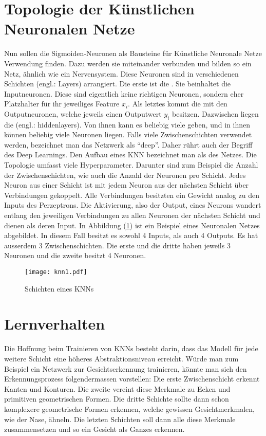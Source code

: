 \para{}
\cite{wiki:kuenstliches_neuron}
\cite{wiki:sigmoidfunktion}


\section{Topologie der Künstlichen Neuronalen Netze}
Nun sollen die Sigmoiden-Neuronen als Bausteine für Künstliche
Neuronale Netze Verwendung finden. Dazu werden sie miteinander verbunden und bilden so ein Netz,
ähnlich wie ein Nervensystem.
\para{}
Diese Neuronen sind in verschiedenen Schichten (engl.: Layers)
arrangiert. Die erste ist die . Sie beinhaltet die
Inputneuronen. Diese sind eigentlich keine richtigen
Neuronen, sondern eher Platzhalter für ihr jeweiliges Feature $x_i$. Als letztes kommt die
 mit den Outputneuronen, welche jeweils einen Outputwert $y_i$
besitzen. Dazwischen liegen die  (engl.: hiddenlayers). Von ihnen kann es
beliebig viele geben, und in ihnen können beliebig viele Neuronen liegen.
Falls viele Zwischenschichten verwendet werden, bezeichnet man das Netzwerk als
``deep''. Daher rührt auch der Begriff des Deep Learnings.
Den Aufbau eines KNN bezeichnet man als  des Netzes. Die
Topologie umfasst viele Hyperparameter. Darunter sind zum Beispiel die Anzahl
der Zwischenschichten, wie auch
die Anzahl der Neuronen pro Schicht.
\para{}
Jedes Neuron aus einer Schicht ist mit jedem Neuron aus der nächsten Schicht über
Verbindungen gekoppelt. Alle Verbindungen besitzten ein Gewicht analog zu den Inputs des
Perzeptrons. Die Aktivierung, also der Output, eines Neurons wandert entlang den jeweiligen
Verbindungen zu allen Neuronen der nächsten Schicht und dienen als deren Input.
\para{}
In Abbildung (\ref{fig:nn_layers}) ist ein Beispiel eines Neuronalen Netzes
abgebildet. In diesem Fall besitzt es sowohl 4 Inputs, als auch 4 Outputs. Es hat
ausserdem 3 Zwischenschichten. Die erste und die dritte haben jeweils 3 Neuronen
und die zweite besitzt 4 Neuronen. \\

\begin{figure}[h!]
  \centering
  \texttt{[image: knn1.pdf]}
  \caption{Schichten eines KNNs}
  \label{fig:nn_layers}
\end{figure}

\cite{wiki:kuenstliches_neuronales_netz}
\cite{Nielsen}

\section{Lernverhalten}
Die Hoffnung beim Trainieren von KNNs besteht darin, dass das Modell für jede
weitere Schicht eine höheres Abstraktionsniveau erreicht. Würde man zum
Beispiel ein Netzwerk zur Gesichtserkennung trainieren, könnte man sich den
Erkennungsprozess folgendermassen vorstellen: Die erste Zwischenschicht erkennt
Kanten und Konturen. Die zweite vereint diese Merkmale zu Ecken und primitiven
geometrischen Formen. Die dritte Schichte sollte dann schon komplexere
geometrische Formen erkennen, welche gewissen Gesichtmerkmalen, wie der Nase,
ähneln.
Die letzten Schichten soll dann alle diese
Merkmale zusammensetzen und so ein Gesicht als Ganzes erkennen.


